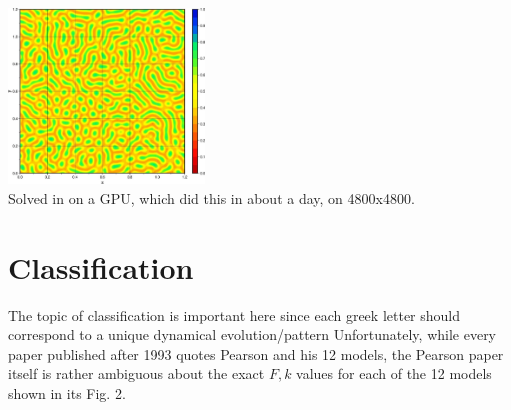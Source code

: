 \begin{center}
\includegraphics[width=5.2cm]{python_codes/fieldstone_171/images/uu000020.jpg}\\
{\captionfont Solved in on a GPU, which did this in about a day, on 4800x4800.}
\end{center}

\section*{Classification}

The topic of classification is important here since each greek letter
should correspond to a unique dynamical evolution/pattern
Unfortunately, while every paper published after 1993 quotes Pearson and 
his 12 models, the Pearson paper itself is rather ambiguous about 
the exact $F,k$ values for each of the 12 models shown in its Fig. 2.

